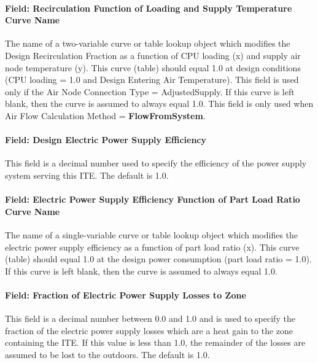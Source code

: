 \paragraph{Field: Recirculation Function of Loading and Supply Temperature Curve Name}\label{field-recirculation-function-of-loading-and-supply-temperature-curve-name}

The name of a two-variable curve or table lookup object which modifies the Design Recirculation Fraction as a function of CPU loading (x) and supply air node temperature (y). This curve (table) should equal 1.0 at design conditions (CPU loading = 1.0 and Design Entering Air Temperature). This field is used only if the Air Node Connection Type = AdjustedSupply. If this curve is left blank, then the curve is assumed to always equal 1.0. This field is only used when Air Flow Calculation Method = \textbf{FlowFromSystem}.

\paragraph{Field: Design Electric Power Supply Efficiency}\label{field-design-electric-power-supply-efficiency}

This field is a decimal number used to specify the efficiency of the power supply system serving this ITE. The default is 1.0.

\paragraph{Field: Electric Power Supply Efficiency Function of Part Load Ratio Curve Name}\label{field-electric-power-supply-efficiency-function-of-part-load-ratio-curve-name}

The name of a single-variable curve or table lookup object which modifies the electric power supply efficiency as a function of part load ratio (x). This curve (table) should equal 1.0 at the design power consumption (part load ratio = 1.0). If this curve is left blank, then the curve is assumed to always equal 1.0.

\paragraph{Field: Fraction of Electric Power Supply Losses to Zone}\label{field-fraction-of-electric-power-supply-losses-to-zone}

This field is a decimal number between 0.0 and 1.0 and is used to specify the fraction of the electric power supply losses which are a heat gain to the zone containing the ITE. If this value is less than 1.0, the remainder of the losses are assumed to be lost to the outdoors. The default is 1.0.

